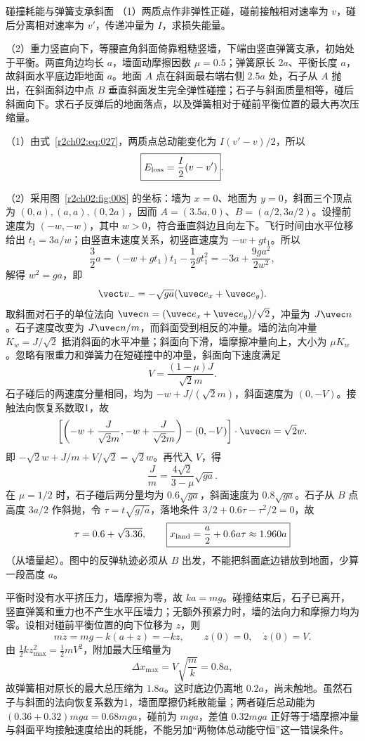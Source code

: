 \begin{practicebox}{碰撞耗能与弹簧支承斜面}
（1）两质点作非弹性正碰，碰前接触相对速率为 $v$，碰后分离相对速率为 $v'$，传递冲量为 $I$，求损失能量。

（2）重力竖直向下，等腰直角斜面倚靠粗糙竖墙，下端由竖直弹簧支承，初始处于平衡。两直角边均长 $a$，墙面动摩擦因数 $\mu=0.5$；弹簧原长 $2a$、平衡长度 $a$，故斜面水平底边距地面 $a$。地面 $A$ 点在斜面最右端右侧 $2.5a$ 处，石子从 $A$ 抛出，在斜面斜边中点 $B$ 垂直斜面发生完全弹性碰撞；石子与斜面质量相等，碰后斜面向下。求石子反弹后的地面落点，以及弹簧相对于碰前平衡位置的最大再次压缩量。
\label{r2ch02:pr:016}
\begin{solution}
（1）由式~\eqref{r2ch02:eq:027}，两质点总动能变化为 $I(v'-v)/2$，所以
\[
 \boxed{E_{\rm loss}=\frac I2(v-v')}.
\]

（2）采用图~\ref{r2ch02:fig:008} 的坐标：墙为 $x=0$、地面为 $y=0$，斜面三个顶点为 $(0,a),(a,a),(0,2a)$，因而
$A=(3.5a,0)$、$B=(a/2,3a/2)$。设撞前速度为 $(-w,-w)$，其中 $w>0$，符合垂直斜边且向左下。飞行时间由水平位移给出 $t_1=3a/w$；由竖直末速度关系，初竖直速度为 $-w+gt_1$。所以
\[
 \frac32a=(-w+gt_1)t_1-\frac12gt_1^2
 =-3a+\frac{9ga^2}{2w^2},
\]
解得 $w^2=ga$，即
\[
 \vect v_-=-\sqrt{ga}(\uvec e_x+\uvec e_y).
\]
\figWedgeImpact
取斜面对石子的单位法向 $\uvec n=(\uvec e_x+\uvec e_y)/\sqrt2$，冲量为 $J\uvec n$。石子速度改变为 $J\uvec n/m$，而斜面受到相反的冲量。墙的法向冲量 $K_w=J/\sqrt2$ 抵消斜面的水平冲量；斜面向下滑，墙摩擦冲量向上，大小为 $\mu K_w$。忽略有限重力和弹簧力在短碰撞中的冲量，斜面向下速度满足
\[
 V=\frac{(1-\mu)J}{\sqrt2m}.
\]
石子碰后的两速度分量相同，均为 $-w+J/(\sqrt2m)$，斜面速度为 $(0,-V)$。接触法向恢复系数取1，故
\[
 \left[\left(-w+\frac{J}{\sqrt2m},-w+\frac{J}{\sqrt2m}\right)
       -(0,-V)\right]\cdot\uvec n=\sqrt2w.
\]
即 $-\sqrt2w+J/m+V/\sqrt2=\sqrt2w$。再代入 $V$，得
\[
 \frac Jm=\frac{4\sqrt2}{3-\mu}\sqrt{ga}.
\]
在 $\mu=1/2$ 时，石子碰后两分量均为 $0.6\sqrt{ga}$，斜面速度为 $0.8\sqrt{ga}$。石子从 $B$ 点高度 $3a/2$ 作斜抛，令 $\tau=t\sqrt{g/a}$，落地条件
$3/2+0.6\tau-\tau^2/2=0$，故
\[
 \tau=0.6+\sqrt{3.36},\qquad
 \boxed{x_{\rm land}=\frac a2+0.6a\tau\approx1.960a}
\]
（从墙量起）。图中的反弹轨迹必须从 $B$ 出发，不能把斜面底边错放到地面，少算一段高度 $a$。

平衡时没有水平挤压力，墙摩擦为零，故 $ka=mg$。碰撞结束后，石子已离开，竖直弹簧和重力也不产生水平压墙力；无额外预紧力时，墙的法向力和摩擦力均为零。设相对碰前平衡位置的向下位移为 $z$，则
\[
 m\ddot z=mg-k(a+z)=-kz,\qquad z(0)=0,\quad\dot z(0)=V.
\]
由 $\tfrac12kz_{\max}^2=\tfrac12mV^2$，附加最大压缩量为
\[
 \boxed{\Delta x_{\max}=V\sqrt{\frac mk}=0.8a},
\]
故弹簧相对原长的最大总压缩为 $1.8a$。这时底边仍离地 $0.2a$，尚未触地。虽然石子与斜面的法向恢复系数为1，墙面摩擦仍耗散能量；两者碰后总动能为 $(0.36+0.32)mga=0.68mga$，碰前为 $mga$，差值 $0.32mga$ 正好等于墙摩擦冲量与斜面平均接触速度给出的耗能，不能另加“两物体总动能守恒”这一错误条件。
\end{solution}
\end{practicebox}

